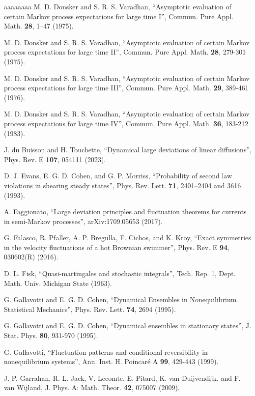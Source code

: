 \documentclass[a4paper,11pt]{article}
\numberwithin{equation}{section}
\begin{document}
\begin{thebibliography}{aaaaaaaa}
 M. D. Donsker and S. R. S. Varadhan, ``Asymptotic evaluation of certain Markov process expectations for large time I'', Commun. Pure Appl. Math. {\bf 28}, 1–47 (1975).

 M. D. Donsker and S. R. S. Varadhan, ``Asymptotic evaluation of certain Markov process expectations for large time II'', Commun. Pure Appl. Math. {\bf 28}, 279-301 (1975).

 M. D. Donsker and S. R. S. Varadhan, ``Asymptotic evaluation of certain Markov process expectations for large time III'', Commun. Pure Appl. Math. {\bf 29}, 389-461 (1976).

 M. D. Donsker and S. R. S. Varadhan, ``Asymptotic evaluation of certain Markov process expectations for large time IV'', Commun. Pure Appl. Math. {\bf 36}, 183-212 (1983).

 J. du Buisson and H. Touchette, ``Dynamical large deviations of linear diffusions'', Phys. Rev. E {\bf 107}, 054111 (2023).

 D. J. Evans, E. G. D. Cohen, and G. P. Morriss,  ``Probability of second law violations in shearing steady states'',
Phys. Rev. Lett. {\bf 71}, 2401–2404 and 3616 (1993).

 A. Faggionato, ``Large deviation principles and fluctuation theorems for currents in semi-Markov processes'', arXiv:1709.05653 (2017). 

 G. Falasco, R. Pfaller, A. P. Bregulla, F. Cichos, and K. Kroy, ``Exact symmetries in the velocity fluctuations of a hot Brownian swimmer'', Phys. Rev. E {\bf 94}, 030602(R) (2016).

 D. L. Fisk, ``Quasi-martingales and stochastic integrals'', Tech. Rep. 1, Dept. Math. Univ. Michigan State (1963).

 G. Gallavotti and E. G. D. Cohen, ``Dynamical Ensembles in Nonequilibrium Statistical Mechanics'', Phys. Rev. Lett. {\bf 74}, 2694 (1995).

 G. Gallavotti and E. G. D. Cohen, ``Dynamical ensembles in stationary states'', J. Stat. Phys. {\bf 80}, 931-970 (1995).

 G. Gallavotti, ``Fluctuation patterns and conditional reversibility in nonequilibrium systems'', Ann. Inst. H. Poincar\'e A {\bf 99}, 429-443 (1999).

 J. P. Garrahan, R. L. Jack, V. Lecomte, E. Pitard, K. van Duijvendijk, and F. van Wijland, J. Phys. A: Math. Theor. {\bf 42}, 075007 (2009).


\end{thebibliography}
\end{document}
